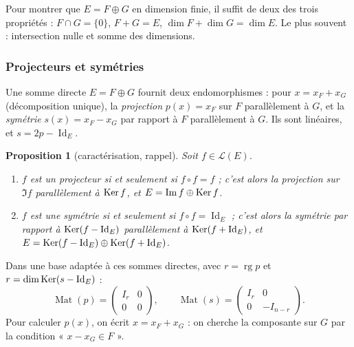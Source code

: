 \documentclass[a4paper,11pt]{article}
\numberwithin{equation}{section}
\numberwithin{figure}{section}
\numberwithin{table}{section}
\theoremstyle{enonce}
\newtheorem{proposition}[definition]{Proposition}
\theoremstyle{exemple}
\theoremstyle{remarque}
\newcommand{\LE}{\mathcal{L}(E)}
\newcommand{\rg}{\operatorname{rg}}
\newcommand{\Mat}{\operatorname{Mat}}
\newcommand{\Id}{\operatorname{Id}}
\begin{document}
\begin{enpratique}
Pour montrer que $E=F\oplus G$ en dimension finie, il suffit de deux des trois propriétés : $F\cap G=\{0\}$, $F+G=E$,
$\dim F+\dim G=\dim E$. Le plus souvent : intersection nulle et somme des dimensions.
\end{enpratique}

\subsubsection*{Projecteurs et symétries}

Une somme directe $E=F\oplus G$ fournit deux endomorphismes : pour $x=x_F+x_G$ (décomposition unique), la \emph{projection}
$p(x)=x_F$ sur $F$ parallèlement à $G$, et la \emph{symétrie} $s(x)=x_F-x_G$ par rapport à $F$ parallèlement à $G$. Ils sont
linéaires, et $s=2p-\Id_E$.

\begin{proposition}[caractérisation, rappel]\label{p:projsym}
Soit $f\in\LE$.
\begin{enumerate}
\item $f$ est un projecteur si et seulement si $f\circ f=f$ ; c'est alors la projection sur $\Im f$ parallèlement à $\operatorname{Ker} f$, et
$E=\operatorname{Im} f\oplus\operatorname{Ker} f$.
\item $f$ est une symétrie si et seulement si $f\circ f=\Id_E$ ; c'est alors la symétrie par rapport à $\Ker(f-\Id_E)$ parallèlement
à $\Ker(f+\Id_E)$, et $E=\Ker(f-\Id_E)\oplus\Ker(f+\Id_E)$.
\end{enumerate}
\end{proposition}

\begin{enpratique}
Dans une base adaptée à ces sommes directes, avec $r=\rg p$ et $r=\dim\Ker(s-\Id_E)$ :
\[\Mat(p)=\begin{pmatrix}I_r&0\\0&0\end{pmatrix},\qquad\Mat(s)=\begin{pmatrix}I_r&0\\0&-I_{n-r}\end{pmatrix}.\]
Pour calculer $p(x)$, on écrit $x=x_F+x_G$ : on cherche la composante sur $G$ par la condition « $x-x_G\in F$ ».
\end{enpratique}
\end{document}
